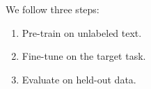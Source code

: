 We follow three steps:
\begin{enumerate}
\item Pre-train on unlabeled text.
\item Fine-tune on the target task.
\item Evaluate on held-out data.
\end{enumerate}
